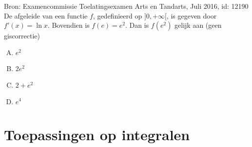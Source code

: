\documentclass[a4paper,12pt, twoside]{article}
\begin{document}
\pagebreak
\begin{oefening}{\scriptsize Bron: Examencommissie Toelatingsexamen Arts en Tandarts, Juli 2016, id: 12190}\\
De afgeleide van een functie $f$, gedefinieerd op $]0,+\infty[$, is gegeven door $f'(x)=\ln x$. Bovendien is $f(e)=e^2$. Dan is $f(e^2)$ gelijk aan \hfill(geen giscorrectie)
\begin{enumerate}[(A)]
  \itemsep.5em
  \item $e^2$
  \item $2e^2$
  \item $2+e^2$
  \item $e^4$
\end{enumerate}
\end{oefening}

\cleardoublepage
\section{Toepassingen op integralen}
\end{document}
